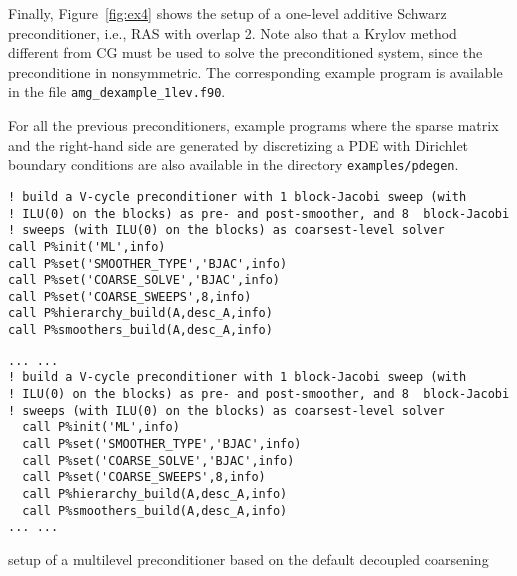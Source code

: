 Finally, Figure~\ref{fig:ex4} shows the setup of a one-level
additive Schwarz preconditioner, i.e., RAS with overlap 2.
Note also that a Krylov method different from CG must be used to solve
the preconditioned system, since the preconditione in nonsymmetric.
The corresponding example program is available in the file
\verb|amg_dexample_1lev.f90|.

For all the previous preconditioners, example programs where the sparse matrix and
the right-hand side are generated by discretizing a PDE with Dirichlet
boundary conditions are also available in the directory \verb|examples/pdegen|.
\vspace{-1em}\begin{listing}[tbh]
\ifpdf%
\begin{verbatim}
! build a V-cycle preconditioner with 1 block-Jacobi sweep (with
! ILU(0) on the blocks) as pre- and post-smoother, and 8  block-Jacobi
! sweeps (with ILU(0) on the blocks) as coarsest-level solver
call P%init('ML',info)
call P%set('SMOOTHER_TYPE','BJAC',info)
call P%set('COARSE_SOLVE','BJAC',info)
call P%set('COARSE_SWEEPS',8,info)
call P%hierarchy_build(A,desc_A,info)
call P%smoothers_build(A,desc_A,info)
\end{verbatim}
\else%
\begin{center}
\begin{minipage}{.90\textwidth}
{\small
\begin{verbatim}
... ...
! build a V-cycle preconditioner with 1 block-Jacobi sweep (with
! ILU(0) on the blocks) as pre- and post-smoother, and 8  block-Jacobi
! sweeps (with ILU(0) on the blocks) as coarsest-level solver
  call P%init('ML',info)
  call P%set('SMOOTHER_TYPE','BJAC',info)
  call P%set('COARSE_SOLVE','BJAC',info)
  call P%set('COARSE_SWEEPS',8,info)
  call P%hierarchy_build(A,desc_A,info)
  call P%smoothers_build(A,desc_A,info)
... ...
\end{verbatim}
}
\end{minipage}
\end{center}
\fi\vspace{-2em}%
\caption{setup of a multilevel preconditioner based on the default decoupled coarsening\label{fig:ex2}}
\end{listing}\vspace*{-2em}
